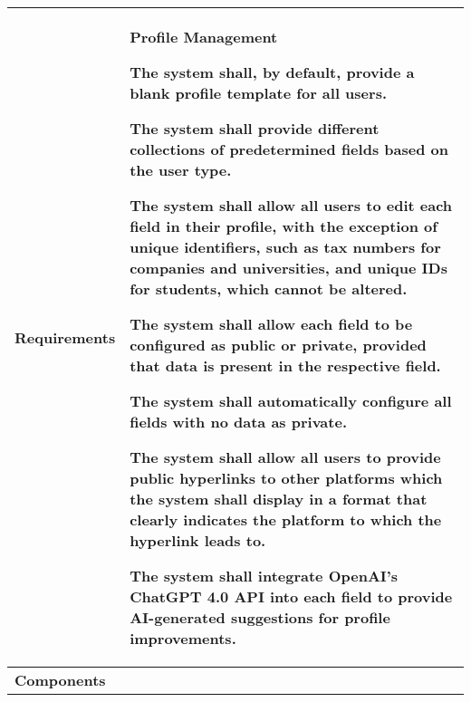 \begin{table}[h]
    \centering
    \renewcommand{\arraystretch}{1.5} %
    \begin{tabular}{|C{0.3\textwidth}|L{0.65\textwidth}|} %
        \hline
        \textbf{Requirements} & 
        \textbf{Profile Management} \par
        [FR13] The system shall, by default, provide a blank profile template for
        all users. \par
       [FR14] The system shall provide different collections of predetermined fields
        based on the user type. \par
        [FR15] The system shall allow all users to edit each field in their profile,
        with the exception of unique identifiers, such as tax numbers for
        companies and universities, and unique IDs for students, which
        cannot be altered. \par
        [FR16] The system shall allow each field to be configured as public or
        private, provided that data is present in the respective field. \par
        [FR17] The system shall automatically configure all fields with no data as
        private. \par
        [FR18] The system shall allow all users to provide public hyperlinks to
        other platforms which the system shall display in a format that
        clearly indicates the platform to which the hyperlink leads to. \par
        [FR19] The system shall integrate OpenAI’s ChatGPT 4.0 API into each
        field to provide AI-generated suggestions for profile improvements. \\
        \hline
        \textbf{Components} & 
        \\
        \hline
    \end{tabular}
\end{table}


